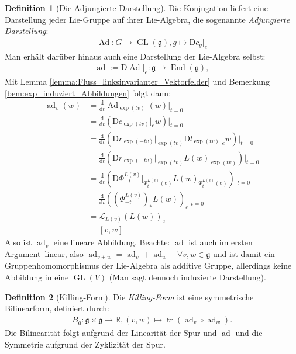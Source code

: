 \documentclass[a4paper]{scrreprt}
\numberwithin{equation}{chapter}
\newcommand{\D}{\mathrm{d}}
\newcommand{\DD}{\mathrm{D}}
\DeclareMathOperator{\GL}{GL}
\DeclareMathOperator{\End}{End}
\DeclareMathOperator{\Ad}{Ad}
\DeclareMathOperator{\ad}{ad}
\DeclareMathOperator{\tr}{tr}
\newcommand{\R}{\mathbb{R}}
\theoremstyle{definition}
\newtheorem{defn}{Definition}[section]
\begin{document}
		\begin{defn}[Die Adjungierte Darstellung]\hfill
		
			Die Konjugation liefert eine Darstellung jeder Lie-Gruppe auf ihrer Lie-Algebra, die sogenannte \emph{Adjungierte Darstellung}:
			\begin{align*}
				\Ad\colon G\rightarrow \GL(\mathfrak{g}), g\mapsto \DD c_g\vert_e
			\end{align*}
			Man erhält darüber hinaus auch eine Darstellung der Lie-Algebra selbst:
			\begin{align*}
				\ad:=\DD\Ad\vert_e\colon\mathfrak{g}\rightarrow\End(\mathfrak{g}),
			\end{align*}
			Mit Lemma \ref{lemma:Fluss_linksinvarianter_Vektorfelder} und Bemerkung \ref{bem:exp_induziert_Abbildungen} folgt dann:
			\begin{align*}
				\ad_v(w)&=\frac{\D}{\D t} \Ad_{\exp(tv)}(w)\Big\vert_{t=0}\\
				&=\frac{\D}{\D t} \left(\DD c_{\exp(tv)}\vert_e w\right)\Big\vert_{t=0}\\
				&=\frac{\D}{\D t} \left(\DD r_{\exp(-tv)}\vert_{\exp(tv)}\DD l_{\exp(tv)}\vert_e w\right)\Big\vert_{t=0}\\
				&=\frac{\D}{\D t} \left(\DD r_{\exp(-tv)}\vert_{\exp(tv)}L(w)_{\exp(tv)}\right)\Big\vert_{t=0}\\
				&=\frac{\D}{\D t} \left(\DD \Phi_{-t}^{L(v)}\vert_{\Phi^{L(v)}_t(e)}L(w)_{\Phi^{L(v)}_t(e)}\right)\Big\vert_{t=0}\\
				&=\frac{\D}{\D t} \left(\left(\Phi_{-t}^{L(v)}\right)_*L(w)\right)_e\Big\vert_{t=0}\\
				&=\mathcal{L}_{L(v)}(L(w))_e\\
				&=\left[v,w\right]
			\end{align*}
			Also ist $\ad_v$ eine lineare Abbildung. Beachte: $\ad$ ist auch \glqq im ersten Argument\grqq\ linear, also $\ad_{v+w}=\ad_v+\ad_w \quad\forall v,w\in\mathfrak{g}$ und ist damit ein Gruppenhomomorphismus der Lie-Algebra als additive Gruppe, allerdings keine Abbildung in eine $\GL(V)$ (Man sagt dennoch \glqq induzierte Darstellung\grqq).
		\end{defn}
		\begin{defn}[Killing-Form]
			Die \emph{Killing-Form} ist eine symmetrische Bilinearform, definiert durch:
			\begin{align*}
				B_{\mathfrak{g}}\colon\mathfrak{g}\times\mathfrak{g}\rightarrow\R, (v,w)\mapsto \tr(\ad_v\circ\ad_w).
			\end{align*}
			Die Bilinearität folgt aufgrund der Linearität der Spur und $\ad$ und die Symmetrie aufgrund der Zyklizität der Spur.
		\end{defn}
\end{document}

